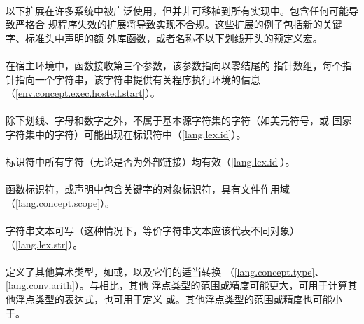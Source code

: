 \paragraph{}
以下扩展在许多系统中被广泛使用，但并非可移植到所有实现中。包含任何可能导致严格合
规程序失效的扩展将导致实现不合规。这些扩展的例子包括新的关键字、标准头中声明的额
外库函数，或者名称不以下划线开头的预定义宏。

\paragraph{}
在宿主环境中，函数接收第三个参数，该参数指向以零结尾的
指针数组，每个指针指向一个字符串，该字符串提供有关程序执行环境的信息
（\ref{env.concept.exec.hosted.start}）。

\paragraph{}
除下划线\tm{\_}、字母和数字之外，不属于基本源字符集的字符（如美元符号\tm{\$}，或
国家字符集中的字符）可能出现在标识符中（\ref{lang.lex.id}）。

\paragraph{}
标识符中所有字符（无论是否为外部链接）均有效（\ref{lang.lex.id}）。

\paragraph{}
函数标识符，或声明中包含关键字的对象标识符，具有文件作用域
（\ref{lang.concept.scope}）。

\paragraph{}
字符串文本可写（这种情况下，等价字符串文本应该代表不同对象）
（\ref{lang.lex.str}）。

\paragraph{}
定义了其他算术类型，如或，以及它们的适当转换
（\ref{lang.concept.type}、\ref{lang.conv.arith}）。与相比，其他
浮点类型的范围或精度可能更大，可用于计算其他浮点类型的表达式，也可用于定义
或。其他浮点类型的范围或精度也可能小于。

